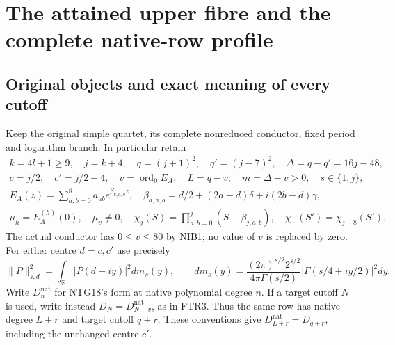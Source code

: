 \begingroup
\section{The attained upper fibre and the complete native-row profile}
\label{sec:ATA}

\subsection{Original objects and exact meaning of every cutoff}
Keep the original simple quartet, its complete nonreduced conductor,
fixed period and logarithm branch.  In particular retain
\[
\begin{gathered}
 k=4l+1\ge9,\quad j=k+4,\quad q=(j+1)^2,\quad q'=(j-7)^2,
 \quad \Delta=q-q'=16j-48,\\
 c=j/2,\quad c'=j/2-4,\quad
 v=\operatorname{ord}_0E_A,\quad L=q-v,\quad m=\Delta-v>0,
 \quad s\in\{1,j\},\\
 E_A(z)=\sum_{a,b=0}^8a_{ab}e^{\beta_{8,a,b}z},\quad
 \beta_{d,a,b}=d/2+(2a-d)\delta+i(2b-d)\gamma,\\
 \mu_h=E_A^{(h)}(0),\quad \mu_v\ne0,\quad
 \chi_j(S)=\prod_{a,b=0}^j(S-\beta_{j,a,b}),\quad
 \chi_-(S')=\chi_{j-8}(S').
\end{gathered}\tag{ATA1}
\]
The actual conductor has $0\le v\le80$ by NIB1; no value of $v$
is replaced by zero.  For either centre $d=c,c'$ use precisely
\[
 \|P\|_{s,d}^2=\int_{\mathbb R}|P(d+iy)|^2dm_s(y),\qquad
 dm_s(y)=\frac{(2\pi)^{s/2}2^{s/2}}{4\pi\Gamma(s/2)}
             |\Gamma(s/4+iy/2)|^2dy.                 \tag{ATA2}
\]
Write $D^{\mathrm{nat}}_n$ for NTG18's form at native polynomial
degree $n$.  If a target cutoff $N$ is used, write instead
$D_N=D^{\mathrm{nat}}_{N-v}$, as in FTR3.  Thus the same row has
native degree $L+r$ and target cutoff $q+r$.  These conventions give
$D^{\mathrm{nat}}_{L+r}=D_{q+r}$, including the unchanged centre $c'$.

